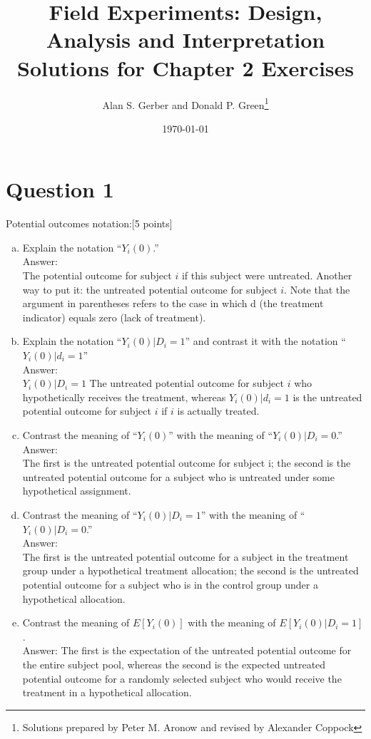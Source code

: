 \documentclass[11pt,notitlepage]{article}		%
\title{Field Experiments: Design, Analysis and Interpretation \\
Solutions for Chapter 2 Exercises}
\author{Alan S. Gerber and Donald P. Green\footnote{Solutions prepared by Peter M. Aronow and revised by Alexander Coppock}}
\date{\today}
\begin{document}
\maketitle


\section*{Question 1}
Potential outcomes notation:[5 points]

\begin{enumerate}[a)]
\item Explain the notation ``$Y_{i}(0)$.''\\
Answer:\\
The potential outcome for subject $i$ if this subject were untreated. Another way to put it: the untreated potential outcome for subject $i$. Note that the argument in parentheses refers to the case in which d (the treatment indicator) equals zero (lack of treatment).

\item Explain the notation ``$Y_{i}(0)|D_i=1$'' and contrast it with the notation ``$Y_{i}(0)|d_i=1$''\\
Answer:\\
$Y_{i}(0)|D_i=1$ The untreated potential outcome for subject $i$ who hypothetically receives the treatment, whereas $Y_{i}(0)|d_i=1$ is the untreated potential outcome for subject $i$ if $i$ is actually treated.

\item Contrast the meaning of ``$Y_{i}(0)$'' with the meaning of ``$Y_{i}(0)|D_{i}=0$.''\\
Answer:\\
The first is the untreated potential outcome for subject i; the second is the untreated potential outcome for a subject who is untreated under some hypothetical assignment.

\item Contrast the meaning of ``$Y_{i}(0)|D_{i}=1$'' with the meaning of ``$Y_{i}(0)|D_{i}=0$.'' \\
Answer:\\
The first is the untreated potential outcome for a subject in the treatment group under a hypothetical treatment allocation; the second is the untreated potential outcome for a subject who is in the control group under a hypothetical allocation.

\item Contrast the meaning of $E[Y_i(0)]$ with the meaning of $E[Y_i(0) | D_{i}=1]$.\\
Answer: The first is the expectation of the untreated potential outcome for the entire subject pool, whereas the second is the expected untreated potential outcome for a randomly selected subject who would receive the treatment in a hypothetical allocation.


\end{enumerate}
\end{document}
